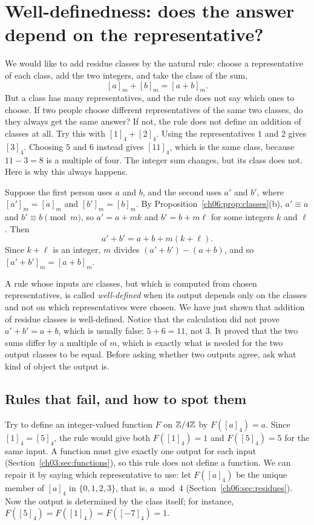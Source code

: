 \section{Well-definedness: does the answer depend on the representative?}\label{ch06:sec:well-defined}
We would like to add residue classes by the natural rule: choose a representative of each class, add the two integers, and take the class of the sum,
\[
[a]_m+[b]_m=[a+b]_m.
\]
But a class has many representatives, and the rule does not say which ones to choose. If two people choose different representatives of the same two classes, do they always get the same answer? If not, the rule does not define an addition of classes at all. Try this with $[1]_4+[2]_4$. Using the representatives $1$ and $2$ gives $[3]_4$. Choosing $5$ and $6$ instead gives $[11]_4$, which is the same class, because $11-3=8$ is a multiple of four. The integer sum changes, but its class does not. Here is why this always happens.

Suppose the first person uses $a$ and $b$, and the second uses $a'$ and $b'$, where $[a']_m=[a]_m$ and $[b']_m=[b]_m$. By Proposition~\ref{ch06:prop:classes}(b), $a'\equiv a$ and $b'\equiv b\pmod m$, so $a'=a+mk$ and $b'=b+m\ell$ for some integers $k$ and $\ell$. Then
\[
a'+b'=a+b+m(k+\ell).
\]
Since $k+\ell$ is an integer, $m$ divides $(a'+b')-(a+b)$, and so $[a'+b']_m=[a+b]_m$.

A rule whose inputs are classes, but which is computed from chosen representatives, is called \emph{well-defined} when its output depends only on the classes and not on which representatives were chosen. We have just shown that addition of residue classes is well-defined. Notice that the calculation did not prove $a'+b'=a+b$, which is usually false: $5+6=11$, not $3$. It proved that the two sums differ by a multiple of $m$, which is exactly what is needed for the two output classes to be equal. Before asking whether two outputs agree, ask what kind of object the output is.

\subsection*{Rules that fail, and how to spot them}
Try to define an integer-valued function $F$ on $\mathbb Z/4\mathbb Z$ by $F([a]_4)=a$. Since $[1]_4=[5]_4$, the rule would give both $F([1]_4)=1$ and $F([5]_4)=5$ for the same input. A function must give exactly one output for each input (Section~\ref{ch03:sec:functions}), so this rule does not define a function. We can repair it by saying which representative to use: let $F([a]_4)$ be the unique member of $[a]_4$ in $\{0,1,2,3\}$, that is, $a\bmod4$ (Section~\ref{ch06:sec:residues}). Now the output is determined by the class itself; for instance, $F([5]_4)=F([1]_4)=F([-7]_4)=1$.

